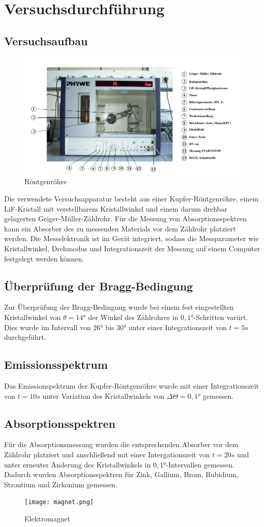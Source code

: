 \section{Versuchsdurchführung}
\subsection{Versuchsaufbau}
\begin{figure}[h]
    \centering
    \includegraphics{Röntgenröhre}
    \caption{Röntgenröhre}
  \end{figure}
Die verwendete Versuchsapparatur besteht aus einer Kupfer-Röntgenröhre, einem LiF-Kristall mit verstellbarem Kristallwinkel und einem darum drehbar gelagerten Geiger-Müller-Zählrohr. Für die Messung von Absorptionsspektren kann ein Absorber des zu messenden Materials vor dem Zählrohr platziert werden. Die Messelektronik ist im Gerät integriert, sodass die Messparameter wie Kristallwinkel, Drehmodus und Integrationszeit der Messung auf einem Computer festgelegt werden können.
\subsection{Überprüfung der Bragg-Bedingung}
Zur Überprüfung der Bragg-Bedingung wurde bei einem fest eingestellten Kristallwinkel von $\theta=14°$ der Winkel des Zählrohres in $0,1°$-Schritten variirt. Dies wurde im Intervall von $26°$ bis $30°$ unter einer Integrationszeit von $t=5s$ durchgeführt.
\subsection{Emissionsspektrum}
Das Emissionspektrum der Kupfer-Röntgenröhre wurde mit einer Integrationszeit von $t=10s$ unter Variation des Kristallwinkels von $\Delta \Theta=0,1°$ gemessen.
\subsection{Absorptionsspektren}
Für die Absorptionsmessung wurden die entsprechenden Absorber vor dem Zählrohr platziert und anschließend mit einer Intergationszeit von $t=20s$ und unter erneuter Änderung des Kristallwinkels in $0,1°$-Intervallen gemessen. Dadurch wurden Absorptionsspektren für Zink, Gallium, Brom, Rubidium, Strontium und Zirkonium gemessen. 
\begin{figure}
    \centering
    \texttt{[image: magnet.png]}
    \caption{Elektromagnet}
    \label{fig:emagnet}
  \end{figure}

  
